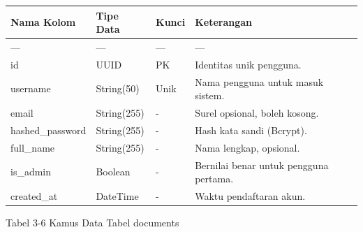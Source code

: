 \documentclass[12pt,a4paper]{article}
\begin{document}
\begin{table}[h]

\centering

\begin{tabular}{llll}

\toprule

Nama Kolom & Tipe Data & Kunci & Keterangan \\

\midrule

--- & --- & --- & --- \\

id & UUID & PK & Identitas unik pengguna. \\

username & String(50) & Unik & Nama pengguna untuk masuk sistem. \\

email & String(255) & - & Surel opsional, boleh kosong. \\

hashed\_password & String(255) & - & Hash kata sandi (Bcrypt). \\

full\_name & String(255) & - & Nama lengkap, opsional. \\

is\_admin & Boolean & - & Bernilai benar untuk pengguna pertama. \\

created\_at & DateTime & - & Waktu pendaftaran akun. \\

\bottomrule

\end{tabular}

\end{table}

Tabel 3-6	Kamus Data Tabel documents
\end{document}
